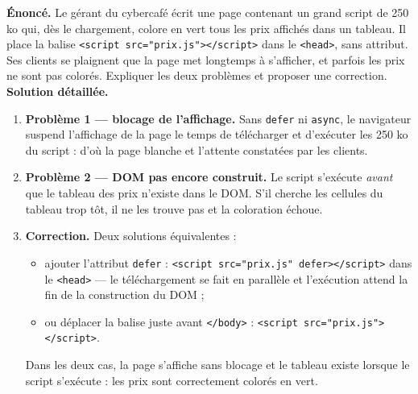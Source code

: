\documentclass[11pt]{article}
\begin{document}
\begin{exoresolu}
\textbf{Énoncé.} Le gérant du cybercafé écrit une page contenant un grand script de 250 ko qui, dès le chargement, colore en vert tous les prix affichés dans un tableau. Il place la balise \texttt{<script src="prix.js"></script>} dans le \texttt{<head>}, sans attribut. Ses clients se plaignent que la page met longtemps à s'afficher, et parfois les prix ne sont pas colorés. Expliquer les deux problèmes et proposer une correction.
\tcblower
\textbf{Solution détaillée.}
\begin{enumerate}
    \item \textbf{Problème 1 — blocage de l'affichage.} Sans \texttt{defer} ni \texttt{async}, le navigateur suspend l'affichage de la page le temps de télécharger et d'exécuter les 250 ko du script : d'où la page blanche et l'attente constatées par les clients.
    \item \textbf{Problème 2 — DOM pas encore construit.} Le script s'exécute \emph{avant} que le tableau des prix n'existe dans le DOM. S'il cherche les cellules du tableau trop tôt, il ne les trouve pas et la coloration échoue.
    \item \textbf{Correction.} Deux solutions équivalentes :
    \begin{itemize}
        \item ajouter l'attribut \texttt{defer} : \texttt{<script src="prix.js" defer></script>} dans le \texttt{<head>} — le téléchargement se fait en parallèle et l'exécution attend la fin de la construction du DOM ;
        \item ou déplacer la balise juste avant \texttt{</body>} : \texttt{<script src="prix.js"></script>}.
    \end{itemize}
    Dans les deux cas, la page s'affiche sans blocage et le tableau existe lorsque le script s'exécute : les prix sont correctement colorés en vert.
\end{enumerate}
\end{exoresolu}
\end{document}
